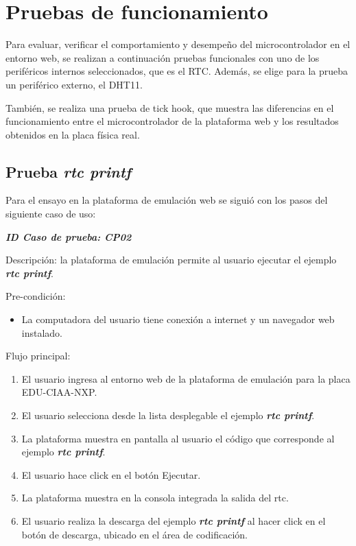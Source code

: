 \section{Pruebas de funcionamiento}  
\label{sec:Pruebas de funcionamiento}

Para evaluar, verificar el comportamiento y desempeño del microcontrolador en el entorno web, se realizan a continuación pruebas funcionales con uno de los periféricos internos seleccionados, que es el RTC. Además, se elige para la prueba un periférico externo, el DHT11.

También, se realiza una prueba de \textquotedbl tick hook\textquotedbl, que muestra las diferencias en el funcionamiento entre el microcontrolador de la plataforma web y los resultados obtenidos en la placa física real.

\subsection{ Prueba \textit{\textbf{rtc printf}}}

Para el ensayo en la plataforma de emulación web se siguió con los pasos del siguiente caso de uso:

\textit{\textbf{ID Caso de prueba: CP02}}

Descripción: la plataforma de emulación permite al usuario ejecutar el ejemplo \textit{\textbf{rtc printf}}.

Pre-condición: 
\begin{itemize}
	\item La computadora del usuario tiene conexión a internet y un navegador web instalado.
\end{itemize}

Flujo principal:
\begin{enumerate}
	\item El usuario ingresa al entorno web de la plataforma de emulación para la placa EDU-CIAA-NXP.
	\item El usuario selecciona desde la lista desplegable el ejemplo \textit{\textbf{rtc printf}}.
	\item La plataforma muestra en pantalla al usuario el código que corresponde al ejemplo \textit{\textbf{rtc printf}}.
	\item El usuario hace click en el botón \textquotedbl Ejecutar\textquotedbl.
	\item La plataforma muestra en la consola integrada la salida del rtc.
	\item El usuario realiza la descarga del ejemplo \textit{\textbf{rtc printf}} al hacer click en el botón de descarga, ubicado en el área de codificación.

\end{enumerate}


